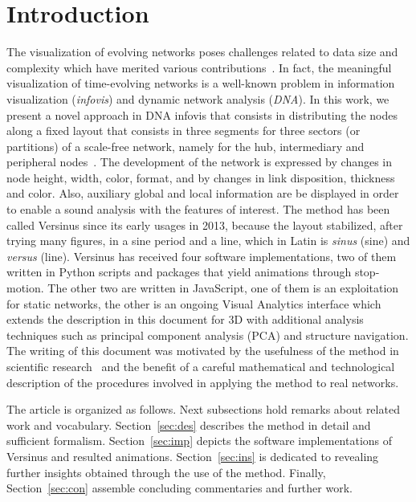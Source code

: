 \documentclass[runningheads]{llncs}
\begin{document}
\section{Introduction}
The visualization of evolving networks poses challenges related to data size and complexity which have merited various contributions~\cite{evo1,evo3,evo2}.
In fact, the meaningful visualization of time-evolving networks is a well-known problem in information visualization (\emph{infovis}) and dynamic network analysis (\emph{DNA}).
In this work, we present a novel approach in DNA infovis that consists in distributing the nodes along a fixed layout that consists in three segments for three sectors (or partitions) of a scale-free network, namely for the hub, intermediary and peripheral nodes~\cite{stab}. The development of the network is expressed by changes in node height, width, color, format, and by changes in link disposition, thickness and color. Also, auxiliary global and local information are be displayed in order to enable a sound analysis with the features of interest.
The method has been called Versinus since its early usages in 2013, because the layout stabilized, after trying many figures, in a sine period and a line, which in Latin is \emph{sinus} (sine) and \emph{versus} (line). 
Versinus has received four software implementations, two of them written in Python scripts and packages that yield animations through stop-motion. The other two are written in JavaScript, one of them is an exploitation for static networks, the other is an ongoing Visual Analytics interface which extends the description in this document for 3D with additional analysis techniques such as principal component analysis (PCA) and structure navigation.
The writing of this document was motivated by the usefulness of the method in scientific research~\cite{thesis,stab} and the benefit of a careful mathematical and technological description of the procedures involved in applying the method to real networks.

The article is organized as follows. Next subsections hold remarks about related work and vocabulary. Section~\ref{sec:des} describes the method in detail and sufficient formalism. Section~\ref{sec:imp} depicts the software implementations of Versinus and resulted animations. Section~\ref{sec:ins} is dedicated to revealing further insights obtained through the use of the method. Finally, Section~\ref{sec:con} assemble concluding commentaries and further work.
\end{document}
